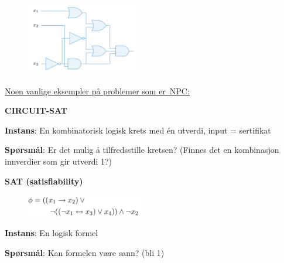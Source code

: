 \documentclass[12pt]{report}
\begin{document}

\begin{figure}[H]
\advance\leftskip 5.03in		\includegraphics[width=1.92in,height=1.24in]{./media/image158.png}
\end{figure}



\uline{Noen vanlige eksempler på problemer som er NPC:}\par


\vspace{\baselineskip}
\textbf{CIRCUIT-SAT}\par

\textbf{Instans}: En kombinatorisk logisk krets med én utverdi, input = sertifikat\par

\textbf{Spørsmål}: Er det mulig å tilfredsstille kretsen? (Finnes det en kombinasjon innverdier som gir utverdi 1?)\par


\vspace{\baselineskip}
\textbf{SAT (satisfiability)}\par




\begin{figure}[H]
\advance\leftskip 3.28in		\includegraphics[width=2.0in,height=0.38in]{./media/image159.png}
\end{figure}



\textbf{Instans}: En logisk formel\par

\textbf{Spørsmål}: Kan formelen være sann? (bli 1)\par
\end{document}
